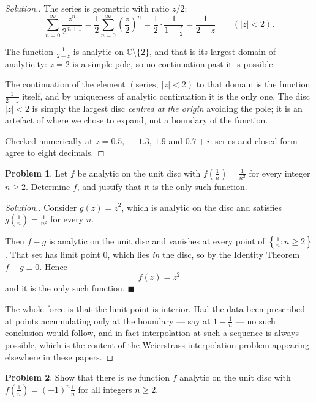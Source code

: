 \documentclass[11pt,a4paper]{article}
\theoremstyle{definition}
\newtheorem{problemx}{Problem}[section]
\newenvironment{problem}{\begin{problemx}}{\end{problemx}}
\newenvironment{solution}
  {\renewcommand{\qedsymbol}{}\begin{proof}[\textit{Solution}.]}
  {\end{proof}}
\begin{document}
\begin{solution}
The series is geometric with ratio $z/2$:
$$\sum^{\infty}_{n=0}\frac{z^{n}}{2^{\,n+1}}
= \frac{1}{2}\sum^{\infty}_{n=0}\left(\frac{z}{2}\right)^{n}
= \frac{1}{2}\cdot\frac{1}{1 - \frac z2}
= \boxed{\frac{1}{2-z}} \qquad \left(\left|z\right| < 2\right).$$

The function $\frac{1}{2-z}$ is analytic on $\mathbb{C}\setminus\{2\}$, and that
is its largest domain of analyticity: $z = 2$ is a simple pole, so no continuation
past it is possible.

The continuation of the element $\left(\text{series},\ \left|z\right|<2\right)$ to
that domain is the function $\frac{1}{2-z}$ itself, and by uniqueness of analytic
continuation it is the only one. The disc $\left|z\right| < 2$ is simply the
largest disc \emph{centred at the origin} avoiding the pole; it is an artefact of
where we chose to expand, not a boundary of the function.

Checked numerically at $z = 0.5,\ -1.3,\ 1.9$ and $0.7+i$: series and closed form
agree to eight decimals.
\end{solution}


\begin{problem}
Let $f$ be analytic on the unit disc with $f\left(\frac{1}{n}\right) = \frac{1}{n^2}$
for every integer $n \geq 2$. Determine $f$, and justify that it is the only such
function.
\end{problem}

\begin{solution}
Consider $g(z) = z^{2}$, which is analytic on the disc and satisfies
$g\!\left(\tfrac1n\right) = \tfrac1{n^{2}}$ for every $n$.

Then $f - g$ is analytic on the unit disc and vanishes at every point of
$\left\{\tfrac1n : n \geq 2\right\}$. That set has limit point $0$, which lies
\emph{in} the disc, so by the Identity Theorem $f - g \equiv 0$. Hence
$$\boxed{f(z) = z^{2}}$$
and it is the only such function. $\blacksquare$

The whole force is that the limit point is interior. Had the data been prescribed
at points accumulating only at the boundary --- say at $1 - \tfrac1n$ --- no such
conclusion would follow, and in fact interpolation at such a sequence is always
possible, which is the content of the Weierstrass interpolation problem appearing
elsewhere in these papers.
\end{solution}


\begin{problem}
Show that there is \emph{no} function $f$ analytic on the unit disc with
$f\left(\frac{1}{n}\right) = (-1)^n \frac{1}{n}$ for all integers $n \geq 2$.
\end{problem}
\end{document}
